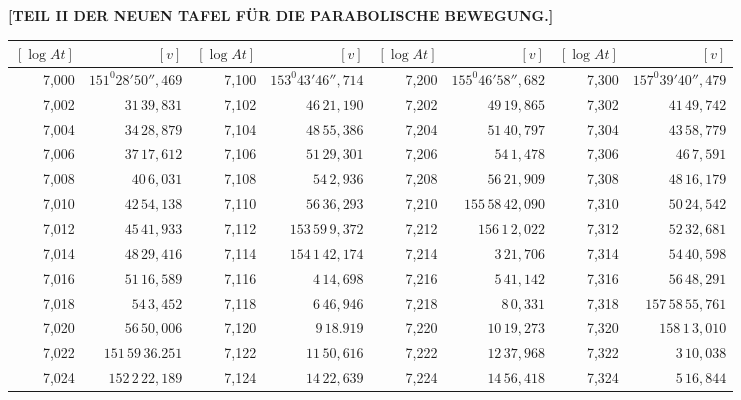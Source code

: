\clearpage
{}
\begingroup
\centering
\fontsize{9}{9}\selectfont
\setlength{\tabcolsep}{.2pt}
\renewcommand{\arraystretch}{.9}
\setlength{\parskip}{0pt}
\textbf{[TEIL II DER NEUEN TAFEL FÜR DIE PARABOLISCHE BEWEGUNG.]}
\par\vspace{7pt}
\begin{tabular}{|r|r||r|r||r|r||r|r|}
\hline
\([\log At]\) & \([v]\) & \([\log At]\) & \([v]\) & \([\log At]\) & \([v]\) & \([\log At]\) & \([v]\) \\
\hline
7,000 & \(151^{0}28'50'',\!469\) & 7,100 & \(153^{0}43'46'',\!714\) & 7,200 & \(155^{0}46'58'',\!682\) & 7,300 & \(157^{0}39'40'',\!479\) \\[1pt]
7,002 & \(31\,39,\!831\) & 7,102 & \(46\,21,\!190\) & 7,202 & \(49\,19,\!865\) & 7,302 & \(41\,49,\!742\) \\
7,004 & \(34\,28,\!879\) & 7,104 & \(48\,55,\!386\) & 7,204 & \(51\,40,\!797\) & 7,304 & \(43\,58,\!779\) \\
7,006 & \(37\,17,\!612\) & 7,106 & \(51\,29,\!301\) & 7,206 & \(54\,1,\!478\) & 7,306 & \(46\,7,\!591\) \\
7,008 & \(40\,6,\!031\) & 7,108 & \(54\,2,\!936\) & 7,208 & \(56\,21,\!909\) & 7,308 & \(48\,16,\!179\) \\
7,010 & \(42\,54,\!138\) & 7,110 & \(56\,36,\!293\) & 7,210 & \(155\,58\,42,\!090\) & 7,310 & \(50\,24,\!542\) \\[1pt]
7,012 & \(45\,41,\!933\) & 7,112 & \(153\,59\,9,\!372\) & 7,212 & \(156\,1\,2,\!022\) & 7,312 & \(52\,32,\!681\) \\
7,014 & \(48\,29,\!416\) & 7,114 & \(154\,1\,42,\!174\) & 7,214 & \(3\,21,\!706\) & 7,314 & \(54\,40,\!598\) \\
7,016 & \(51\,16,\!589\) & 7,116 & \(4\,14,\!698\) & 7,216 & \(5\,41,\!142\) & 7,316 & \(56\,48,\!291\) \\
7,018 & \(54\,3,\!452\) & 7,118 & \(6\,46,\!946\) & 7,218 & \(8\,0,\!331\) & 7,318 & \(157\,58\,55,\!761\) \\
7,020 & \(56\,50,\!006\) & 7,120 & \(9\,18.919\) & 7,220 & \(10\,19,\!273\) & 7,320 & \(158\,1\,3,\!010\) \\[1pt]
7,022 & \(151\,59\,36.251\) & 7,122 & \(11\,50,\!616\) & 7,222 & \(12\,37,\!968\) & 7,322 & \(3\,10,\!038\) \\
7,024 & \(152\,2\,22,\!189\) & 7,124 & \(14\,22,\!639\) & 7,224 & \(14\,56,\!418\) & 7,324 & \(5\,16,\!844\) \\

\end{tabular}
